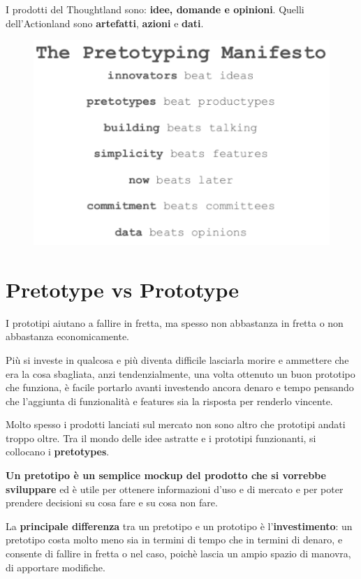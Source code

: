 \documentclass[a4paper,11pt,oneside]{book}
\begin{document}
I prodotti del Thoughtland sono: \textbf{idee, domande e opinioni}. Quelli dell'Actionland sono \textbf{artefatti}, \textbf{azioni} e \textbf{dati}.

\begin{figure}[!h]
	\centering
	\includegraphics[scale=0.6]{immagini/Manifesto.png}
\end{figure}

\section{Pretotype vs Prototype}
I prototipi aiutano a fallire in fretta, ma spesso non abbastanza in fretta o non abbastanza economicamente.

Più si investe in qualcosa e più diventa difficile lasciarla morire e ammettere che era la cosa sbagliata, anzi tendenzialmente, una volta ottenuto un buon prototipo che funziona, è facile portarlo avanti investendo ancora denaro e tempo pensando che l'aggiunta di funzionalità e features sia la risposta per renderlo vincente.

Molto spesso i prodotti lanciati sul mercato non sono altro che prototipi andati troppo oltre. Tra il mondo delle idee astratte e i prototipi funzionanti, si collocano i \textbf{pretotypes}.

\textbf{Un pretotipo è un semplice mockup del prodotto che si vorrebbe sviluppare} ed è utile per ottenere informazioni d'uso e di mercato e per poter prendere decisioni su cosa fare e su cosa non fare.

La \textbf{principale differenza} tra un pretotipo e un prototipo è l'\textbf{investimento}: un pretotipo costa molto meno sia in termini di tempo che in termini di denaro, e consente di fallire in fretta o nel caso, poichè lascia un ampio spazio di manovra, di apportare modifiche.
\end{document}
